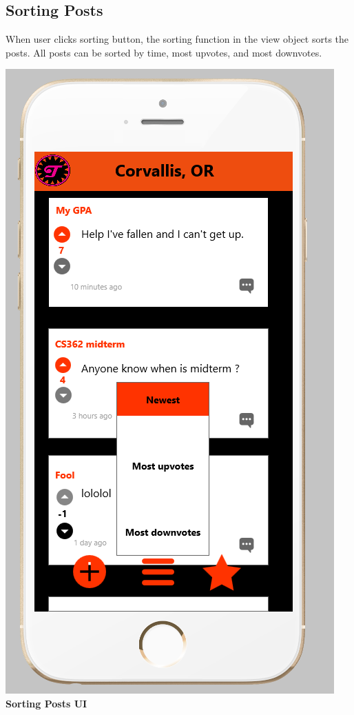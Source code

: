 \documentclass[12pt]{article}
\begin{document}
\subsection{Sorting Posts}
When user clicks sorting button, the sorting function in the view object sorts the posts. All posts can be sorted by time, most upvotes, and most downvotes.
\begin{center}
\includegraphics[scale=0.30]{img/ui/sorting}\linebreak
\textbf{Sorting Posts UI}
  \end{center}
\end{document}
